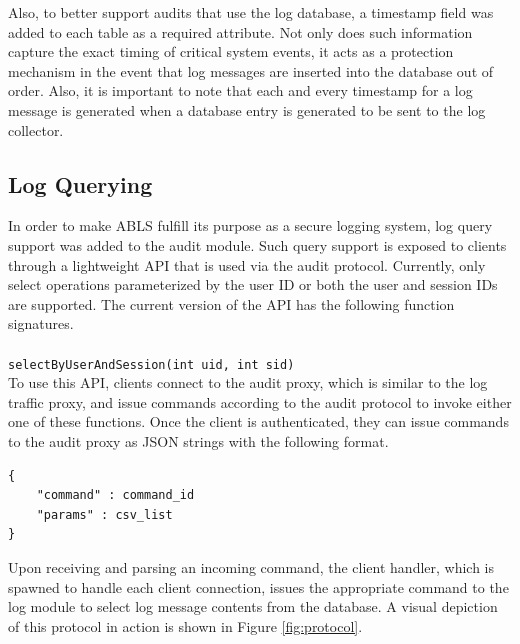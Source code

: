 \documentclass{sig-alternate}
\begin{document}
Also, to better support audits that use the log database, a timestamp field was added to each table as a required
attribute. Not only does such information capture the exact timing of critical system events, it acts as a protection
mechanism in the event that log messages are inserted into the database out of order. Also, it is important to note that
each and every timestamp for a log message is generated when a database entry is generated to be sent to the log 
collector. 

\subsection{Log Querying}
\label{sec:querying}
In order to make ABLS fulfill its purpose as a secure logging system, log query support was added to the audit
module. Such query support is exposed to clients through a lightweight API that is used via the audit protocol.
Currently, only select operations parameterized by the user ID or both the user and session IDs are supported. 
The current version of the API has the following function signatures. \\

 \\
{\tt selectByUserAndSession(int uid, int sid)}\\

To use this API, clients connect to the audit proxy, which is similar to the log traffic proxy, and issue commands according to
the audit protocol to invoke either one of these functions. Once the client is authenticated, they can issue commands to the
audit proxy as JSON strings with the following format. \\

\begin{lstlisting}
{     
    "command" : command_id
    "params" : csv_list
}
\end{lstlisting}

Upon receiving and parsing an incoming command, the client handler, which is spawned to handle each client connection,
issues the appropriate command to the log module to select log message contents from the database. 
A visual depiction of this protocol in action is shown in Figure \ref{fig:protocol}.
\end{document}

